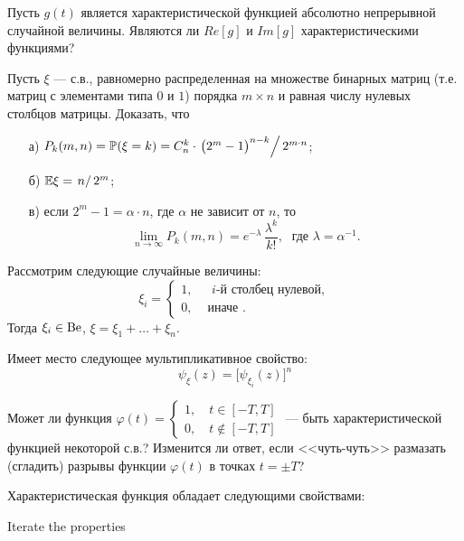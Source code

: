 \begin{problem}
Пусть $g(t)$ является характеристической функцией абсолютно непрерывной случайной величины. Являются ли $Re[g]$ и $Im[g]$ характеристическими функциями?
\end{problem}


\begin{problem}
Пусть $\xi$ --- с.в., равномерно распределенная на множестве бинарных матриц (т.е. матриц с элементами типа $0$ и $1$) порядка 
$m\times n$ и равная числу нулевых столбцов матрицы. Доказать, что 
\begin{enumerate}
\item[а)] $P_k(m,n)={\mathbb P}(\xi=k)=C_n^k\cdot \left.\bigl( 2^m -1\bigr)^{n-k}\right/ 2^{m\cdot n}$; 

\item[б)] ${\mathbb E}\xi=\left. n\right/2^m$; 
\item[в)] если $2^m-1=\alpha\cdot n$, где $\alpha$ не зависит от $n$, то 
$$
\lim\limits_{n\to\infty} P_k(m,n)=e^{-\lambda}\, \frac{\lambda^k}{k!} ,\; \text{ где } \lambda=\alpha^{-1} .
$$
\end{enumerate}
\end{problem}

\begin{ordre}

Рассмотрим следующие случайные величины: 
$$
\xi_i=\begin{cases}
1, & \text{ $i$-й столбец нулевой}, \\
0, & \text{ иначе }.
\end{cases} 
$$
Тогда $\xi_i\in\mathrm{Be}$, $\xi=\xi_1+\ldots +\xi_n$. 

Имеет место следующее мультипликативное свойство:
$$
\psi_{\xi}(z)=\bigl[\psi_{\xi_i}(z)\bigr]^n
$$

\end{ordre}


\begin{problem}
Может ли функция $\varphi(t)=\begin{cases}1,\quad t\in[-T,T]\\
0,\quad t\notin[-T,T] \end{cases}$ --- 
быть характеристической функцией некоторой с.в.? Изменится ли ответ, если <<чуть-чуть>> размазать (сгладить) разрывы функции 
$\varphi(t)$ в точках $t=\pm T$? 
\end{problem}

\begin{ordre}
Характеристическая функция обладает следующими свойствами:
\begin{fixme}
Iterate the properties 
\end{fixme}
\end{ordre}



